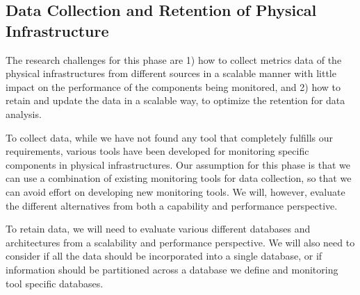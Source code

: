 \subsection{Data Collection and Retention of Physical Infrastructure}


The research challenges for this phase are 1) how to collect metrics data of the physical infrastructures from different sources in a scalable manner with little impact on the performance of the components being monitored, and 2) how to retain and update the data in a scalable way, to optimize the retention for data analysis.

To collect data, while we have not found any tool that completely fulfills our requirements, various tools have been developed for monitoring specific components in physical infrastructures. Our assumption for this phase is that we can use a combination of existing monitoring tools for data collection, so that we can avoid effort on developing new monitoring tools. We will, however, evaluate the different alternatives from both a capability and performance perspective.

To retain data, we will need to evaluate various different databases and architectures from a scalability and performance perspective. We will also need to consider if all the data should be incorporated into a single database, or if information should be partitioned across a database we define and monitoring tool specific databases.

